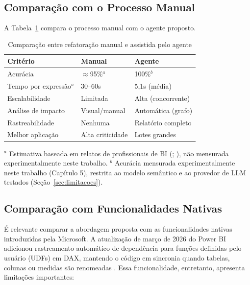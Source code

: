 \documentclass[
    12pt,               %
    openright,          %
    oneside,            %
    a4paper,            %
    chapter=TITLE,      %
    section=TITLE,      %
    brazil              %
]{abntex2}
\begin{document}
\subsection{Comparação com o Processo Manual}

A Tabela~\ref{tab:manual-vs-agente} compara o processo manual com o agente proposto.

\begin{table}[H]
    \centering
    \caption{Comparação entre refatoração manual e assistida pelo agente}
    \label{tab:manual-vs-agente}
    \begin{tabularx}{\textwidth}{lXX}
        \toprule
        \textbf{Critério} & \textbf{Manual} & \textbf{Agente} \\
        \midrule
        Acurácia                   & $\approx$95\%$^{a}$  & 100\%$^{b}$ \\
        Tempo por expressão$^{a}$  & 30--60s        & 5,1s (média) \\
        Escalabilidade             & Limitada       & Alta (concorrente) \\
        Análise de impacto         & Visual/manual  & Automática (grafo) \\
        Rastreabilidade            & Nenhuma        & Relatório completo \\
        Melhor aplicação           & Alta criticidade & Lotes grandes \\
        \bottomrule
    \end{tabularx}
    \par\vspace{0.3cm}\footnotesize $^{a}$ Estimativa baseada em relatos de profissionais de BI (; ), não mensurada experimentalmente neste trabalho. $^{b}$ Acurácia mensurada experimentalmente neste trabalho (Capítulo 5), restrita ao modelo semântico e ao provedor de LLM testados (Seção~\ref{sec:limitacoes}).
\end{table}

\subsection{Comparação com Funcionalidades Nativas}
\label{sec:comparacao-nativas}

É relevante comparar a abordagem proposta com as funcionalidades nativas introduzidas pela Microsoft. A atualização de março de 2026 do Power BI adicionou rastreamento automático de dependência para funções definidas pelo usuário (UDFs) em DAX, mantendo o código em sincronia quando tabelas, colunas ou medidas são renomeadas \cite{microsoft2026daxudf}. Essa funcionalidade, entretanto, apresenta limitações importantes:
\end{document}
